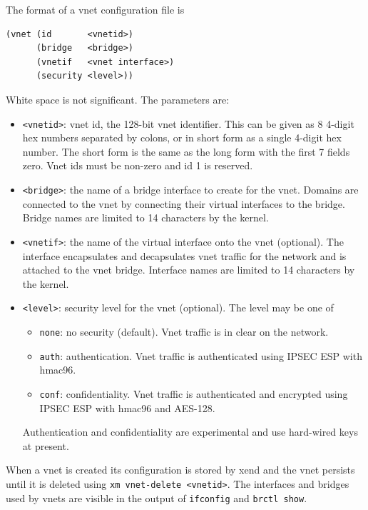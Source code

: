 \documentclass[11pt,twoside,final,openright]{report}
\def\xend{{xend}\xspace}
\begin{document}
The format of a vnet configuration file is
\begin{verbatim}
(vnet (id       <vnetid>)
      (bridge   <bridge>)
      (vnetif   <vnet interface>)
      (security <level>))
\end{verbatim}
White space is not significant. The parameters are:
\begin{itemize}
  \item \verb|<vnetid>|: vnet id, the 128-bit vnet identifier. This can be given
    as 8 4-digit hex numbers separated by colons, or in short form as a single 4-digit hex number.
    The short form is the same as the long form with the first 7 fields zero.
    Vnet ids must be non-zero and id 1 is reserved.

  \item \verb|<bridge>|: the name of a bridge interface to create for the vnet. Domains
    are connected to the vnet by connecting their virtual interfaces to the bridge.
    Bridge names are limited to 14 characters by the kernel.

  \item \verb|<vnetif>|: the name of the virtual interface onto the vnet (optional). The
    interface encapsulates and decapsulates vnet traffic for the network and is attached
    to the vnet bridge. Interface names are limited to 14 characters by the kernel.

  \item \verb|<level>|: security level for the vnet (optional). The level may be one of 
      \begin{itemize}
        \item \verb|none|: no security (default). Vnet traffic is in clear on the network.
        \item \verb|auth|: authentication. Vnet traffic is authenticated using IPSEC
           ESP with hmac96.
        \item \verb|conf|: confidentiality. Vnet traffic is authenticated and encrypted
           using IPSEC ESP with hmac96 and AES-128.
      \end{itemize}
      Authentication and confidentiality are experimental and use hard-wired keys at present.
\end{itemize}
When a vnet is created its configuration is stored by \xend and the vnet persists until it is
deleted using \texttt{xm vnet-delete <vnetid>}. The interfaces and bridges used by vnets
are visible in the output of \texttt{ifconfig} and \texttt{brctl show}.
\end{document}
